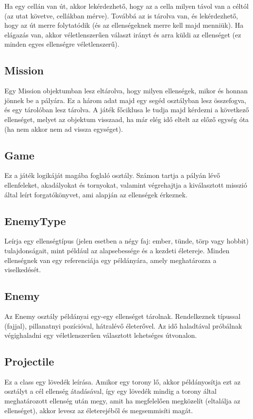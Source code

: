 Ha egy cellán van út, akkor lekérdezhető, hogy az a cella milyen távol van a céltól (az utat követve, cellákban mérve). Továbbá az is tárolva van, és lekérdezhető, hogy az út merre folytatódik (és az ellenségeknek merre kell majd menniük). Ha elágazás van, akkor véletlenszerűen választ irányt és arra küldi az ellenséget (ez minden egyes ellenségre véletlenszerű).

\subsection{Mission}
Egy Mission objektumban lesz eltárolva, hogy milyen ellenségek, mikor és honnan jönnek be a pályára. Ez a három adat majd egy segéd osztályban lesz összefogva, és egy tárolóban lesz tárolva. A játék főciklusa le tudja majd kérdezni a következő ellenséget, melyet az objektum visszaad, ha már elég idő eltelt az előző egység óta (ha nem akkor nem ad vissza egységet).

\subsection{Game}
Ez a játék logikáját magába foglaló osztály. Számon tartja a pályán lévő ellenfeleket, akadályokat és tornyokat, valamint végrehajtja a kiválasztott misszió által leírt forgatókönyvet, ami alapján az ellenségek érkeznek.

\subsection{EnemyType}
Leírja egy ellenségtípus (jelen esetben a négy faj: ember, tünde, törp vagy hobbit) tulajdonságait, mint például az alapsebessége és a kezdeti életereje. Minden ellenségnek van egy referenciája egy példányára, amely meghatározza a viselkedését.

\subsection{Enemy}
Az Enemy osztály példányai egy-egy ellenséget tárolnak. Rendelkeznek típussal (fajjal), pillanatnyi pozícióval, hátralévő életerővel. Az idő haladtával próbálnak végighaladni egy véletlenszerűen választott lehetséges útvonalon.

\subsection{Projectile}
Ez a class egy lövedék leírása. Amikor egy torony lő, akkor példányosítja ezt az osztályt a cél ellenség átadásával, így egy lövedék mindig a torony által meghatározott ellenség után megy, amit ha megfelelően megközelít (eltalálja az ellenséget), akkor levesz az életerejéből és megsemmisíti magát.

